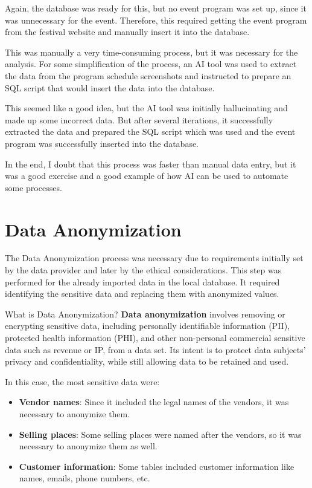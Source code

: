 Again, the database was ready for this, but no event program was set up, since it was unnecessary for the event.
Therefore, this required getting the event program from the festival website and manually insert it into the database.

This was manually a very time-consuming process, but it was necessary for the analysis.
For some simplification of the process, an AI tool was used to extract the data from the program schedule screenshots and instructed to prepare an SQL script that would insert the data into the database.

This seemed like a good idea, but the AI tool was initially hallucinating and made up some incorrect data.
But after several iterations, it successfully extracted the data and prepared the SQL script which was used and the event program was successfully inserted into the database.

In the end, I doubt that this process was faster than manual data entry, but it was a good exercise and a good example of how AI can be used to automate some processes.


\section{Data Anonymization}
\label{sec:data-methodology-anonymization}
The Data Anonymization process was necessary due to requirements initially set by the data provider and later by the ethical considerations.
This step was performed for the already imported data in the local database.
It required identifying the sensitive data and replacing them with anonymized values.

\begin{infobox}{What is Data Anonymization?}
	\textbf{Data anonymization} involves removing or encrypting sensitive data, including personally identifiable information (PII), protected health information (PHI), and other non-personal commercial sensitive data such as revenue or IP, from a data set.
	Its intent is to protect data subjects' privacy and confidentiality, while still allowing data to be retained and used\cite{hd_data_anonymization_techniques}.
\end{infobox}

In this case, the most sensitive data were:
\begin{itemize}
	\item \textbf{Vendor names}: Since it included the legal names of the vendors, it was necessary to anonymize them.
	\item \textbf{Selling places}: Some selling places were named after the vendors, so it was necessary to anonymize them as well.
	\item \textbf{Customer information}: Some tables included customer information like names, emails, phone numbers, etc.
\end{itemize}

